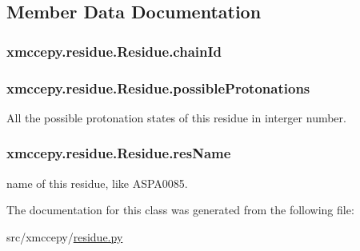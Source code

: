 \subsection{Member Data Documentation}
\hypertarget{classxmccepy_1_1residue_1_1_residue_afdd072f15f2fa5640bd67e0e5f6eb1de}{
\subsubsection[{chain\-Id}]{\setlength{\rightskip}{0pt plus 5cm}xmccepy.\-residue.\-Residue.\-chain\-Id}}\label{classxmccepy_1_1residue_1_1_residue_afdd072f15f2fa5640bd67e0e5f6eb1de}
\hypertarget{classxmccepy_1_1residue_1_1_residue_a11fc883a79c0221399f7a36fee4a6f9a}{
\subsubsection[{possible\-Protonations}]{\setlength{\rightskip}{0pt plus 5cm}xmccepy.\-residue.\-Residue.\-possible\-Protonations}}\label{classxmccepy_1_1residue_1_1_residue_a11fc883a79c0221399f7a36fee4a6f9a}


All the possible protonation states of this residue in interger number. 

\hypertarget{classxmccepy_1_1residue_1_1_residue_a07eb4b463b514b1f1e86d03a6ff02a98}{
\subsubsection[{res\-Name}]{\setlength{\rightskip}{0pt plus 5cm}xmccepy.\-residue.\-Residue.\-res\-Name}}\label{classxmccepy_1_1residue_1_1_residue_a07eb4b463b514b1f1e86d03a6ff02a98}


name of this residue, like A\-S\-P\-A0085. 



The documentation for this class was generated from the following file\-:\begin{DoxyCompactItemize}
\item 
src/xmccepy/\hyperlink{residue_8py}{residue.\-py}\end{DoxyCompactItemize}
